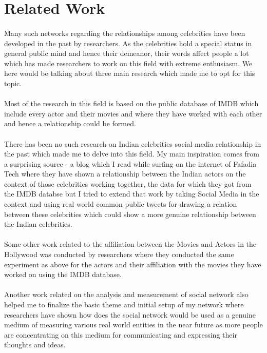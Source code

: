 \documentclass[runningheads,a4paper]{llncs}
\begin{document}
\section{Related Work}

\paragraph{}
Many such networks regarding the relationships among celebrities have been developed in the past by researchers. As the celebrities hold a special status in general public mind and hence their demeanor, their words affect people a lot which has made researchers to work on this field with extreme enthusiasm. We here would be talking about three main research which made me to opt for this topic.
\paragraph{}
Most of the research in this field is based on the public database of IMDB which include every actor and their movies and where they have worked with each other and hence a relationship could be formed.
\paragraph{}
There has been no such research on Indian celebrities social media relationship in the past which made me to delve into this field. My main inspiration comes from a surprising source - a blog which I read while surfing on the internet of Fafadia Tech \cite{fafadia} where they have shown a relationship between the Indian actors on the context of those celebrities working together, the data for which they got from the IMDB databse but I tried to extend that work by taking Social Media in the context and using real world common public tweets for drawing a relation between these celebrities which could show a more genuine relationship between the Indian celebrities.
\paragraph{}
Some other work related to the affiliation between the Movies and Actors in the Hollywood was conducted by researchers \cite{1} where they conducted the same experiment as above for the actors and their affiliation with the movies they have worked on using the IMDB database.
\paragraph{}
Another work related on the analysis and measurement of social network \cite{2} also helped me to finalize the basic theme and initial setup of my network where researchers have shown how does the social network would be used as a genuine medium of measuring various real world entities in the near future as more people are concentrating on this medium for communicating and expressing their thoughts and ideas.
\end{document}
